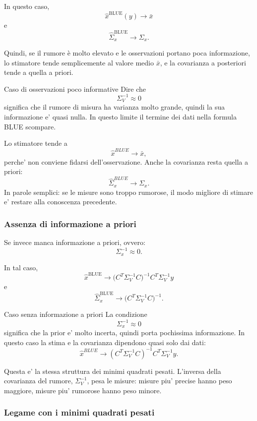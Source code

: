 \documentclass[11pt,a4paper]{article}
\begin{document}
In questo caso,
\[
\hat x^{\mathrm{BLUE}}(y)\to \bar x
\]
e
\[
\hat\Sigma_x^{\mathrm{BLUE}}\to \Sigma_x.
\]

Quindi, se il rumore è molto elevato e le osservazioni portano poca informazione, lo stimatore tende semplicemente al valore medio \(\bar x\), e la covarianza a posteriori tende a quella a priori.

\begin{spiegazione}{Caso di osservazioni poco informative}
Dire che
\[
\Sigma_V^{-1}\approx 0
\]
significa che il rumore di misura ha varianza molto grande, quindi la sua informazione e' quasi nulla. In questo limite il termine dei dati nella formula BLUE scompare.

Lo stimatore tende a
\[
\hat x^{BLUE}\to \bar x,
\]
perche' non conviene fidarsi dell'osservazione. Anche la covarianza resta quella a priori:
\[
\hat\Sigma_x^{BLUE}\to \Sigma_x.
\]
In parole semplici: se le misure sono troppo rumorose, il modo migliore di stimare e' restare alla conoscenza precedente.
\end{spiegazione}

\subsubsection*{Assenza di informazione a priori}

Se invece manca informazione a priori, ovvero:
\[
\Sigma_x^{-1}\approx 0.
\]

In tal caso,
\[
\hat x^{\mathrm{BLUE}}
\to
\bigl(C^T\Sigma_V^{-1}C\bigr)^{-1}C^T\Sigma_V^{-1}y
\]
e
\[
\hat\Sigma_x^{\mathrm{BLUE}}
\to
\bigl(C^T\Sigma_V^{-1}C\bigr)^{-1}.
\]

\begin{spiegazione}{Caso senza informazione a priori}
La condizione
\[
\Sigma_x^{-1}\approx 0
\]
significa che la prior e' molto incerta, quindi porta pochissima informazione. In questo caso la stima e la covarianza dipendono quasi solo dai dati:
\[
\hat x^{BLUE}
\to
(C^T\Sigma_V^{-1}C)^{-1}C^T\Sigma_V^{-1}y.
\]

Questa e' la stessa struttura dei minimi quadrati pesati. L'inversa della covarianza del rumore, $\Sigma_V^{-1}$, pesa le misure: misure piu' precise hanno peso maggiore, misure piu' rumorose hanno peso minore.
\end{spiegazione}

\subsubsection*{Legame con i minimi quadrati pesati}
\end{document}
